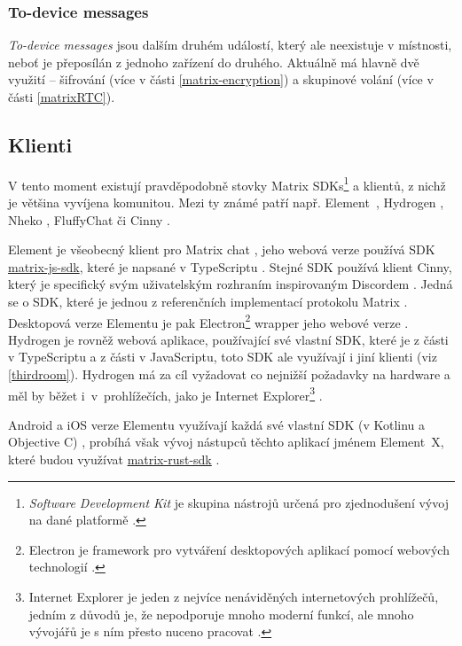 \subsubsection{To-device messages}

\textit{To-device messages} jsou dalším druhém událostí, který ale neexistuje v
místnosti, neboť je přeposílán z jednoho zařízení do druhého. Aktuálně má hlavně
dvě využití -- šifrování (více v části \ref{matrix-encryption}) a skupinové
volání (více v části \ref{matrixRTC}).

\subsection{Klienti}

V tento moment existují pravděpodobně stovky Matrix SDKs\footnote{
	\textit{Software Development Kit} je skupina nástrojů určená pro zjednodušení
	vývoj na dané platformě \cite{RedHat-WhatIsAnSDK}.
} a klientů, z nichž je většina vyvíjena komunitou. Mezi ty známé patří např.
Element~\cite{Element-Homepage}, Hydrogen \cite{GitHub-Hydrogen}, Nheko
\cite{GitHub-Nheko}, FluffyChat \cite{FluffyChat-Homepage} či Cinny
\cite{Cinny-Homepage}.

Element je všeobecný klient pro Matrix chat \cite{Element-Homepage}, jeho webová
verze používá SDK
\href{https://github.com/matrix-org/matrix-js-sdk/}{matrix-js-sdk}, které je
napsané v TypeScriptu \cite{GitHub-MatrixJSSDK}. Stejné SDK používá klient
Cinny, který je specifický svým uživatelským rozhraním inspirovaným Discordem
\cite{Cinny-Homepage,GitHub-Cinny}. Jedná se o SDK, které je jednou z
referenčních implementací protokolu Matrix \cite{GitHub-MatrixJSSDK}. Desktopová
verze Elementu je pak Electron\footnote{
	Electron je framework pro vytváření desktopových aplikací pomocí webových
	technologií \cite{ElectronJS-Homepage}.
} wrapper jeho webové verze \cite{GitHub-ElementDesktop}. Hydrogen je rovněž
webová aplikace, používající své vlastní SDK, které je z části v TypeScriptu a
z části v JavaScriptu, toto SDK ale využívají i jiní klienti (viz
\ref{thirdroom}). Hydrogen má za cíl vyžadovat co nejnižší požadavky na hardware a
měl by běžet i~v~prohlížečích, jako je Internet Explorer\footnote{
	Internet Explorer je jeden z nejvíce nenáviděných internetových prohlížečů,
	jedním z důvodů je, že nepodporuje mnoho moderní funkcí, ale mnoho vývojářů je s
	ním přesto nuceno pracovat
	\cite{ZealousSites-WhyDoWebDevelopersHateInternetExplorer}.
} \cite{GitHub-Hydrogen}.

Android a iOS verze Elementu využívají každá své vlastní SDK (v Kotlinu a
Objective C) \cite{GitHub-ElementAndroid,GitHub-ElementIOS}, probíhá však vývoj
nástupců těchto aplikací jménem Element~X, které budou využívat
\href{https://github.com/matrix-org/matrix-rust-sdk}{matrix-rust-sdk}
\cite{GitHub-ElementXAndroid,GitHub-ElementXIOS}.

